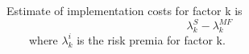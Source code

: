 \documentclass{article}
\begin{document}
Estimate of implementation costs for factor k is 
\[
    \lambda^{S}_{k} - \lambda^{MF}_{k}
\]
~~~~where $\lambda^{i}_{k}$ is the risk premia for factor k.
\end{document}
